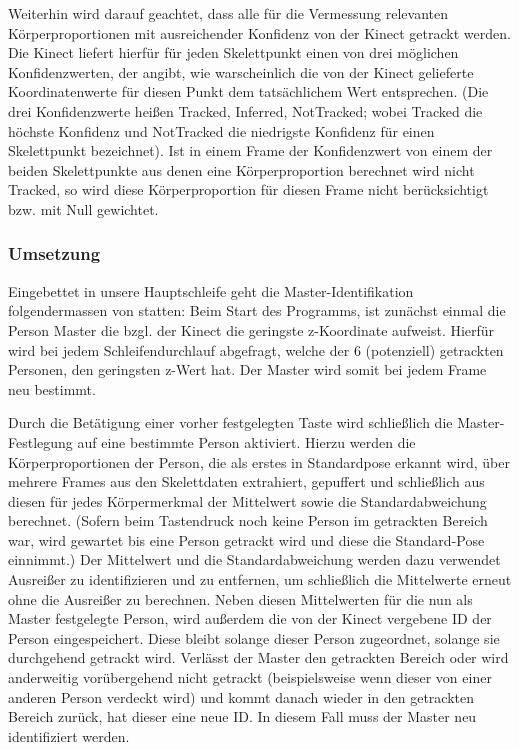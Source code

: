 \par
Weiterhin wird darauf geachtet, dass alle für die Vermessung relevanten Körperproportionen mit ausreichender Konfidenz von der Kinect getrackt werden. Die Kinect liefert hierfür für jeden Skelettpunkt einen von drei möglichen Konfidenzwerten, der angibt, wie warscheinlich die von der Kinect gelieferte Koordinatenwerte für diesen Punkt dem tatsächlichem Wert entsprechen. (Die drei Konfidenzwerte heißen Tracked, Inferred, NotTracked; wobei Tracked die höchste Konfidenz und NotTracked die niedrigste Konfidenz für einen Skelettpunkt bezeichnet). Ist in einem Frame der Konfidenzwert von einem der beiden Skelettpunkte aus denen eine Körperproportion berechnet wird nicht Tracked, so wird diese Körperproportion für diesen Frame nicht berücksichtigt bzw. mit Null gewichtet. \par
\subsubsection{Umsetzung}
Eingebettet in unsere Hauptschleife geht die Master-Identifikation folgendermassen von statten: Beim Start des Programms, ist zunächst einmal die Person Master die bzgl. der Kinect die geringste z-Koordinate aufweist. Hierfür wird bei jedem Schleifendurchlauf abgefragt, welche der 6 (potenziell) getrackten Personen, den geringsten z-Wert hat. Der Master wird somit bei jedem Frame neu bestimmt.
\par
 Durch die Betätigung einer vorher festgelegten Taste wird schließlich die Master-Festlegung auf eine bestimmte Person aktiviert. Hierzu werden die Körperproportionen der Person, die als erstes in Standardpose erkannt wird, über mehrere Frames aus den Skelettdaten extrahiert, gepuffert und schließlich aus diesen für jedes Körpermerkmal der Mittelwert sowie die Standardabweichung berechnet. (Sofern beim Tastendruck noch keine Person im getrackten Bereich war, wird gewartet bis eine Person getrackt wird und diese die Standard-Pose einnimmt.) Der Mittelwert und die Standardabweichung werden dazu verwendet Ausreißer zu identifizieren und zu entfernen, um schließlich die Mittelwerte erneut ohne die Ausreißer zu berechnen. Neben diesen Mittelwerten für die nun als Master festgelegte Person, wird außerdem die von der Kinect vergebene ID der Person eingespeichert. Diese bleibt solange dieser Person zugeordnet, solange sie durchgehend getrackt wird. Verlässt der Master den getrackten Bereich oder wird anderweitig vorübergehend nicht getrackt (beispielsweise wenn dieser von einer anderen Person verdeckt wird) und kommt danach wieder in den getrackten Bereich zurück, hat dieser eine neue ID. In diesem Fall muss der Master neu identifiziert werden. 
 
